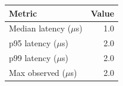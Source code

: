 \begin{tabular}{lr}
\toprule
Metric & Value \\
\midrule
Median latency ($\mu$s) & 1.0 \\
p95 latency ($\mu$s) & 2.0 \\
p99 latency ($\mu$s) & 2.0 \\
Max observed ($\mu$s) & 2.0 \\
\bottomrule
\end{tabular}
